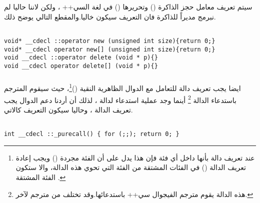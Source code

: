 \documentclass[document.tex]{subfiles}
\begin{document}
سيتم تعريف معامل حجز الذاكرة  () وتحريرها () في لغة السي++ ، ولكن لاننا حاليا لم نبرمج مديراً للذاكرة فان التعريف سيكون خاليا.والمقطع التالي يوضح ذلك.
\begin{english}

\lstset{numberstyle=\tiny,numbers=left,stepnumber=1,numbersep=5pt,tabsize=2,extendedchars=true,breaklines=true,frame=b,showspaces=false, showtabs=false,xleftmargin=10pt,framexleftmargin=10pt,framexrightmargin=5pt,framexbottommargin=4pt,showstringspaces=false,language=C++}



\begin{lstlisting}[label=newdelete,caption=\en{Global new/delete operator}]

void* __cdecl ::operator new (unsigned int size){return 0;}
void* __cdecl operator new[] (unsigned int size){return 0;}
void __cdecl ::operator delete (void * p){}
void __cdecl operator delete[] (void * p){}

\end{lstlisting}
\end{english}

\subsubsection{}
ايضا يجب تعريف دالة للتعامل مع الدوال الظاهرية النقية ()\footnote{عند تعريف دالة بأنها  داخل أي فئة فإن هذا يدل على أن الفئة مجردة () ويجب إعادة تعريف الدالة () في الفئات المشتقة من الفئة التي تحوي هذه الدالة، والا ستكون الفئة المشتقة .}، حيث سيقوم المترجم باستدعاء الدالة \footnote{هذه الدالة يقوم مترجم الفيجوال سي++ باستدعائها.وقد تختلف من مترجم لآخر.} أينما وجد عملية استدعاء لدالة  ، لذلك أن أردنا دعم الدوال  يجب تعريف الدالة  ، وحاليا سيكون التعريف كالاتي.


\begin{english}

\lstset{numberstyle=\tiny,numbers=left,stepnumber=1,numbersep=5pt,tabsize=2,extendedchars=true,breaklines=true,frame=b,showspaces=false, showtabs=false,xleftmargin=10pt,framexleftmargin=10pt,framexrightmargin=5pt,framexbottommargin=4pt,showstringspaces=false,language=C++}


\begin{lstlisting}[label=purevirtual,caption=\en{Pure virtual function call handler}]

int __cdecl ::_purecall() { for (;;); return 0; }

\end{lstlisting}
\end{english}
\end{document}

